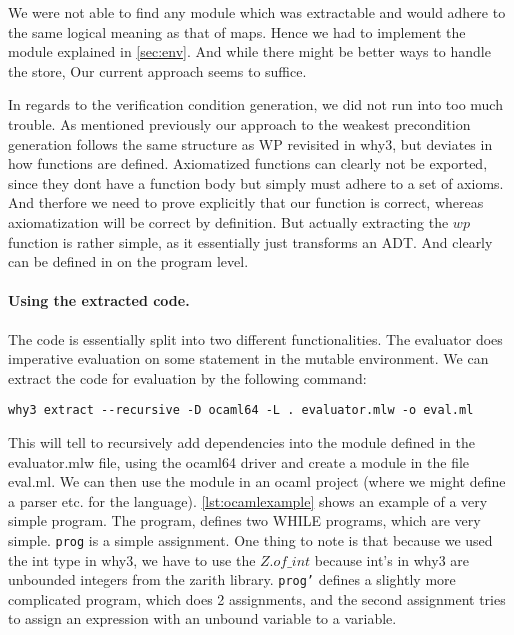 We were not able to find any module which was extractable and would adhere to the same logical meaning as that of maps.
Hence we had to implement the module explained in \ref{sec:env}.
And while there might be better ways to handle the store, Our current approach seems to suffice.

In regards to the verification condition generation, we did not run into too much trouble.
As mentioned previously our approach to the weakest precondition generation follows the same structure as WP revisited in why3\cite{},
but deviates in how functions are defined.
Axiomatized functions can clearly not be exported,
since they dont have a function body but simply must adhere to a set of axioms.
And therfore we need to prove explicitly that our function is correct,
whereas axiomatization will be correct by definition.
But actually extracting the $wp$ function is rather simple, as it essentially just transforms an ADT.
And clearly can be defined in on the program level.


\paragraph{Using the extracted code.}
The code is essentially split into two different functionalities.
The evaluator does imperative evaluation on some statement in the mutable environment.
We can extract the code for evaluation by the following command:

\begin{lstlisting}
why3 extract --recursive -D ocaml64 -L . evaluator.mlw -o eval.ml
\end{lstlisting}

This will tell to recursively add dependencies into the module defined in the evaluator.mlw file, using the ocaml64 driver and create a module in the file eval.ml.
We can then use the module in an ocaml project (where we might define a parser etc. for the language).
\autoref{lst:ocamlexample} shows an example of a very simple program.
The program, defines two WHILE programs, which are very simple.
\texttt{prog} is a simple assignment. One thing to note is that because we used the int type in why3, we have to use the \(Z.of\_int\) because int's in why3 are unbounded integers from the zarith library.
\texttt{prog'} defines a slightly more complicated program, which does 2 assignments, and the second assignment tries to assign an expression with an unbound variable to a variable.

